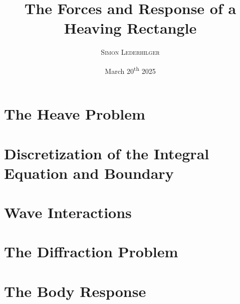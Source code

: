 \documentclass{article}
\title{The Forces and Response of a Heaving Rectangle}
\subtitle{\emph{\headcourse}}
\author{\textsc{Simon Lederhilger}}
\date{March 20\textsuperscript{th} 2025}
\begin{document}
\maketitle\thispagestyle{fancy}
    \begin{multicols*}{2}
        \section[Heave]{The Heave Problem}
        

        \section[Discretizations]{Discretization of the Integral Equation and Boundary}
        

        \section[Waves]{Wave Interactions}
        

        \section[Diffraction]{The Diffraction Problem}
        

        \section[Response]{The Body Response}
        
    \end{multicols*}
\end{document}
